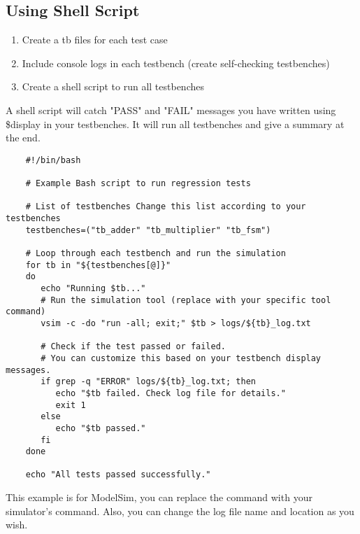 \documentclass{report}
\begin{document}
\subsection{Using Shell Script}
\begin{enumerate}
    \item Create a tb files for each test case
    \item Include console logs in each testbench (create self-checking testbenches)
    \item Create a shell script to run all testbenches
\end{enumerate}

A shell script will catch "PASS" and "FAIL" messages you have written using \$display in your testbenches. It will run all testbenches and give a summary at the end. 
\begin{verbatim}
    #!/bin/bash

    # Example Bash script to run regression tests
    
    # List of testbenches Change this list according to your testbenches
    testbenches=("tb_adder" "tb_multiplier" "tb_fsm")
    
    # Loop through each testbench and run the simulation
    for tb in "${testbenches[@]}"
    do
       echo "Running $tb..."
       # Run the simulation tool (replace with your specific tool command)
       vsim -c -do "run -all; exit;" $tb > logs/${tb}_log.txt
    
       # Check if the test passed or failed. 
       # You can customize this based on your testbench display messages.
       if grep -q "ERROR" logs/${tb}_log.txt; then
          echo "$tb failed. Check log file for details."
          exit 1
       else
          echo "$tb passed."
       fi
    done
    
    echo "All tests passed successfully."
\end{verbatim}
This example is for ModelSim, you can replace the command with your simulator's command. Also, you can change the log file name and location as you wish.
\end{document}
